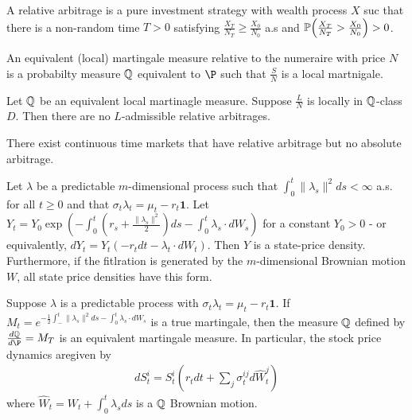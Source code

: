 \begin{defn}
  \label{sec:arbitr-theory-cont-10}
  A relative arbitrage is a pure investment strategy with wealth
  process $X$ suc that there is a non-random time $T > 0$ satisfying
  $\frac{X_{T}}{N_{T}} \geq \frac{X_{0}}{N_{0}}$ a.s and
  $\Prob{\frac{X_{T}}{N_{T}} > \frac{X_{0}}{N_{0}}} > 0$.
\end{defn}

\begin{defn}
  \label{sec:arbitr-theory-cont-11}
  An equivalent (local) martingale measure relative to the numeraire
  with price $N$ is a probabilty measure $\Q$ equivalent to $\P$ such
  that $\frac{S}{N}$ is a local martnigale.
\end{defn}

\begin{thm}
  \label{sec:arbitr-theory-cont-12}
  Let $\Q$ be an equivalent local martinagle measure.  Suppose
  $\frac{L}{N}$ is locally in $\Q$-class $D$.  Then there are no
  $L$-admissible relative arbitrages.
\end{thm}

\begin{thm}
  \label{sec:arbitr-theory-cont-13}
  There exist continuous time markets that have relative arbitrage but
  no absolute arbitrage.
\end{thm}

\begin{thm}
  \label{sec:arbitr-theory-cont-14}
  Let $\lambda$ be a predictable $m$-dimensional process such that
  $\int_{0}^{t} \| \lambda_{s} \|^{2}ds < \infty$ a.s. for all $t \geq
  0$ and that $\sigma_{t} \lambda_{t} = \mu_{t} - r_{t} \mathbf{1}$.
  Let $Y_{t} = Y_{0} \exp(-\int_{0}^{t} (r_{s} + \frac{\|
    \lambda_{s}\|^{2}}{2}) ds - \int_{0}^{t} \lambda_{s} \cdot
  dW_{s})$ for a constant $Y_{0} > 0$ - or equivalently, $dY_{t} =
  Y_{t}(-r_{t} dt - \lambda_{t} \cdot dW_{t})$.  Then $Y$ is a
  state-price density.  Furthermore, if the fitlration is generated by
  the $m$-dimensional Brownian motion $W$, all state price densities
  have this form.
\end{thm}

\begin{thm}
  \label{sec:arbitr-theory-cont-15}
  Suppose $\lambda$ is a predictable process with $\sigma_{t}
  \lambda_{t} = \mu_{t} - r_{t} \mathbf{1}$.  If $M_{t} =
  e^{-\frac{1}{2} \int_{-}^{t} \| \lambda_{s} \|^{2}ds - \int_{0}^{t}
    \lambda_{s} \cdot dW_{s}}$ is a true martingale, then the measure
  $\Q$ defined by $\frac{d\Q}{d\P} = M_{T}$ is an equivalent
  martingale measure.  In particular, the stock price dynamics
  aregiven by
  \begin{align}
    \label{eq:6}
    dS^{i}_{t} = S^{i}_{t}(r_{t} dt + \sum_{j} \sigma^{ij}_{t} d\hat W_{t}^{j})
  \end{align} where $\hat W_{t} = W_{t} + \int_{0}^{t} \lambda_{s} ds$
  is a $\Q$ Brownian motion.
\end{thm}

